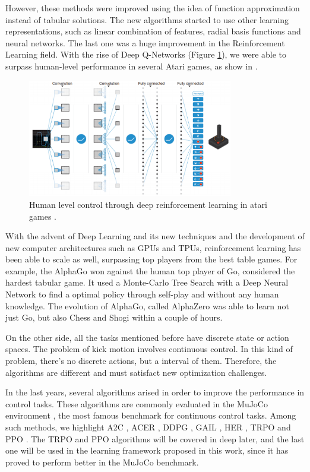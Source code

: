 However, these methods were improved using the idea of function approximation instead of tabular solutions. The new algorithms started to use other learning representations, such as linear combination of features, radial basis functions and neural networks. The last one was a huge improvement in the Reinforcement Learning field. With the rise of Deep Q-Networks (Figure \ref{dqn}), we were able to surpass human-level performance in several Atari games, as show in \cite{mnih2015humanlevel}.

\begin{figure}[ht!]
	\centering
	\includegraphics[width=0.8\textwidth]{Cap2/dqn.eps}
	\caption{Human level control through deep reinforcement learning in atari games
		\cite{mnih2015humanlevel}.}
	\label{dqn}
\end{figure}

With the advent of Deep Learning and its new techniques and the development of new computer architectures such as GPUs and TPUs, reinforcement learning has been able to scale as well, surpassing top players from the best table games. For example, the AlphaGo \cite{alphago} won against the human top player of Go, considered the hardest tabular game. It used a Monte-Carlo Tree Search with a Deep Neural Network to find a optimal policy through self-play and without any human knowledge. The evolution of AlphaGo, called AlphaZero \cite{alphazero} was able to learn not just Go, but also Chess and Shogi within a couple of hours.

On the other side, all the tasks mentioned before have discrete state or action spaces. The problem of kick motion involves continuous control. In this kind of problem, there's no discrete actions, but a interval of them. Therefore, the algorithms are different and must satisfact new optimization challenges.

In the last years, several algorithms arised in order to improve the performance in control tasks. These algorithms are commonly evaluated in the MuJoCo environment \cite{mujoco}, the most famous benchmark for continuous control tasks. Among such methods, we highlight A2C \cite{a2c}, ACER \cite{acer}, DDPG \cite{ddpg}, GAIL \cite{gail}, HER \cite{her}, TRPO \cite{trpo} and PPO \cite{ppoalgorithm}. The TRPO and PPO algorithms will be covered in deep later, and the last one will be used in the learning framework proposed in this work, since it has proved to perform better in the MuJoCo benchmark.

